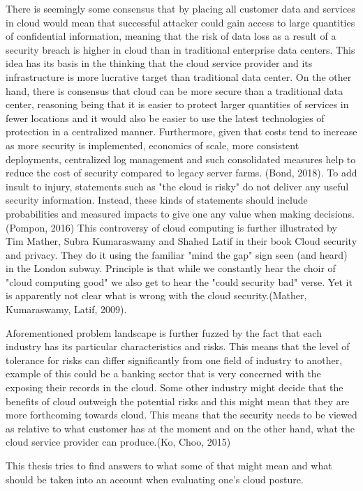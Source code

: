 \documentclass{article}
\begin{document}
There is seemingly some consensus that by placing all customer data and services in cloud would mean that successful attacker could gain access to large quantities of confidential information, meaning that the risk of data loss as a result of a security breach is higher in cloud than in traditional enterprise data centers. This idea has its basis in the thinking that the cloud service provider and its infrastructure is more lucrative target than traditional data center. On the other hand, there is consensus that cloud can be more secure than a traditional data center, reasoning being that it is easier to protect larger quantities of services in fewer locations and it would also be easier to use the latest technologies of protection in a centralized manner. Furthermore, given that costs tend to increase as more security is implemented, economics of scale, more consistent deployments, centralized log management and such consolidated measures help to reduce the cost of security compared to legacy server farms. (Bond, 2018). To add insult to injury, statements such as "the cloud is risky" do not deliver any useful security information. Instead, these kinds of statements should include probabilities and measured impacts to give one any value when making decisions.(Pompon, 2016) 
This controversy of cloud computing is further illustrated by Tim Mather, Subra Kumaraswamy and Shahed Latif in their book Cloud security and privacy. They do it using the familiar "mind the gap" sign seen (and heard) in the London subway. Principle is that while we constantly hear the choir of "cloud computing good" we also get to hear the "could security bad" verse. Yet it is apparently not clear what is wrong with the cloud security.(Mather, Kumaraswamy, Latif, 2009).
\par
Aforementioned problem landscape is further fuzzed by the fact that each industry has its particular characteristics and risks. This means that the level of tolerance for risks can differ significantly from one field of industry to another, example of this could be a banking sector that is very concerned with the exposing their records in the cloud. Some other industry might decide that the benefits of cloud outweigh the potential risks and this might mean that they are more forthcoming towards cloud. This means that the security needs to be viewed as relative to what customer has at the moment and on the other hand, what the cloud service provider can produce.(Ko, Choo, 2015)
\par
This thesis tries to find answers to what some of that might mean and what should be taken into an account when evaluating one's cloud posture.
\end{document}
